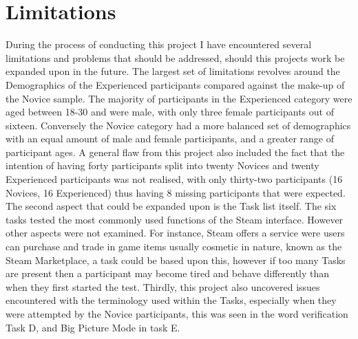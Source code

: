 \section{Limitations}
During the process of conducting this project I have encountered several limitations and problems that should be addressed, should this projects work be expanded upon in the future. The largest set of limitations revolves around the Demographics of the Experienced participants compared against the make-up of the Novice sample. The majority of participants in the Experienced category were aged between 18-30 and were male, with only three female participants out of sixteen. Conversely the Novice category had a more balanced set of demographics with an equal amount of male and female participants, and a greater range of participant ages. A general flaw from this project also included the fact that the intention of having forty participants split into twenty Novices and twenty Experienced participants was not realised, with only thirty-two participants (16 Novices, 16 Experienced) thus having 8 missing participants that were expected.  The second aspect that could be expanded upon is the Task list itself. The six tasks tested the most commonly used functions of the Steam interface. However other aspects were not examined. For instance, Steam offers a service were users can purchase and trade in game items usually cosmetic in nature, known as the Steam Marketplace, a task could be based upon this, however if too many Tasks are present then a participant may become tired and behave differently than when they first started the test. Thirdly, this project also uncovered issues encountered with the terminology used within the Tasks, especially when they were attempted by the Novice participants, this was seen in the word verification Task D, and Big Picture Mode in task E.

